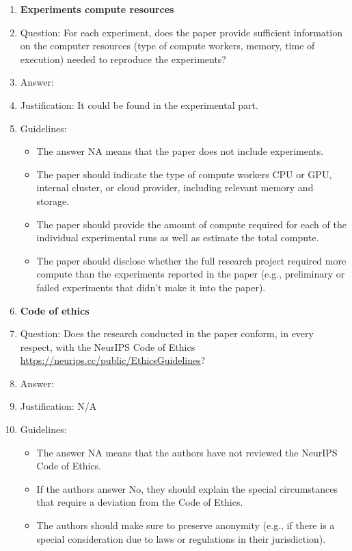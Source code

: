 \documentclass{article}
\begin{document}
\begin{enumerate}
\item {\bf Experiments compute resources}
    \item[] Question: For each experiment, does the paper provide sufficient information on the computer resources (type of compute workers, memory, time of execution) needed to reproduce the experiments?
    \item[] Answer: \answerYes{} %
    \item[] Justification: It could be found in the experimental part.
    \item[] Guidelines:
    \begin{itemize}
        \item The answer NA means that the paper does not include experiments.
        \item The paper should indicate the type of compute workers CPU or GPU, internal cluster, or cloud provider, including relevant memory and storage.
        \item The paper should provide the amount of compute required for each of the individual experimental runs as well as estimate the total compute. 
        \item The paper should disclose whether the full research project required more compute than the experiments reported in the paper (e.g., preliminary or failed experiments that didn't make it into the paper). 
    \end{itemize}
    
\item {\bf Code of ethics}
    \item[] Question: Does the research conducted in the paper conform, in every respect, with the NeurIPS Code of Ethics \url{https://neurips.cc/public/EthicsGuidelines}?
    \item[] Answer: \answerNA{} %
    \item[] Justification: N/A
    \item[] Guidelines:
    \begin{itemize}
        \item The answer NA means that the authors have not reviewed the NeurIPS Code of Ethics.
        \item If the authors answer No, they should explain the special circumstances that require a deviation from the Code of Ethics.
        \item The authors should make sure to preserve anonymity (e.g., if there is a special consideration due to laws or regulations in their jurisdiction).
    \end{itemize}



\end{enumerate}
\end{document}
